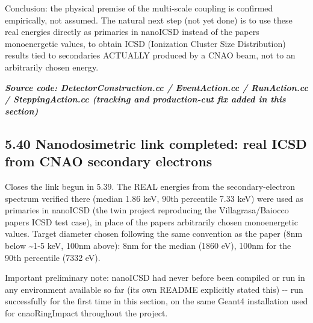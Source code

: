 \documentclass[
  english,
]{article}
\begin{document}
Conclusion: the physical premise of the multi-scale coupling is confirmed empirically, not assumed. The natural next step (not yet done) is to use these real energies directly as primaries in nanoICSD instead of the paper\textquotesingle s monoenergetic values, to obtain ICSD (Ionization Cluster Size Distribution) results tied to secondaries ACTUALLY produced by a CNAO beam, not to an arbitrarily chosen energy.

\textit{\textbf{Source code: DetectorConstruction.cc / EventAction.cc / RunAction.cc / SteppingAction.cc (tracking and production-cut fix added in this section)}}





\subsection{5.40 Nanodosimetric link completed: real ICSD from CNAO secondary electrons}\label{nanodosimetric-link-completed-real-icsd-from-cnao-secondary-electrons}

Closes the link begun in 5.39. The REAL energies from the secondary-electron spectrum verified there (median 1.86 keV, 90th percentile 7.33 keV) were used as primaries in nanoICSD (the twin project reproducing the Villagrasa/Baiocco paper\textquotesingle s ICSD test case), in place of the paper\textquotesingle s arbitrarily chosen monoenergetic values. Target diameter chosen following the same convention as the paper (8nm below \textasciitilde1-5 keV, 100nm above): 8nm for the median (1860 eV), 100nm for the 90th percentile (7332 eV).

Important preliminary note: nanoICSD had never before been compiled or run in any environment available so far (its own README explicitly stated this) -\/- run successfully for the first time in this section, on the same Geant4 installation used for cnaoRingImpact throughout the project.
\end{document}
